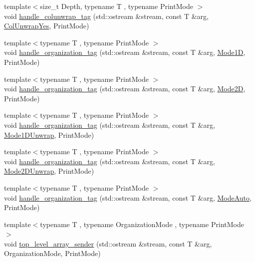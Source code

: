 \begin{DoxyCompactItemize}
{\footnotesize template$<$size\+\_\+t Depth, typename T , typename Print\+Mode $>$ }\\void \hyperlink{namespacegnuplotio_a3b8981d3f39de8a058b5f18484f06c3c}{handle\+\_\+colunwrap\+\_\+tag} (std\+::ostream \&stream, const T \&arg, \hyperlink{structgnuplotio_1_1_col_unwrap_yes}{Col\+Unwrap\+Yes}, Print\+Mode)
\item 
{\footnotesize template$<$typename T , typename Print\+Mode $>$ }\\void \hyperlink{namespacegnuplotio_af809657552a53c3b17f0400a5c210a7f}{handle\+\_\+organization\+\_\+tag} (std\+::ostream \&stream, const T \&arg, \hyperlink{structgnuplotio_1_1_mode1_d}{Mode1D}, Print\+Mode)
\item 
{\footnotesize template$<$typename T , typename Print\+Mode $>$ }\\void \hyperlink{namespacegnuplotio_a1310221abf0551a805d4482f0612317b}{handle\+\_\+organization\+\_\+tag} (std\+::ostream \&stream, const T \&arg, \hyperlink{structgnuplotio_1_1_mode2_d}{Mode2D}, Print\+Mode)
\item 
{\footnotesize template$<$typename T , typename Print\+Mode $>$ }\\void \hyperlink{namespacegnuplotio_a99e6125b97bc2ca4241f6275d83f05d4}{handle\+\_\+organization\+\_\+tag} (std\+::ostream \&stream, const T \&arg, \hyperlink{structgnuplotio_1_1_mode1_d_unwrap}{Mode1\+D\+Unwrap}, Print\+Mode)
\item 
{\footnotesize template$<$typename T , typename Print\+Mode $>$ }\\void \hyperlink{namespacegnuplotio_a9d2cee7a7f2ed9748a0f135b206836d3}{handle\+\_\+organization\+\_\+tag} (std\+::ostream \&stream, const T \&arg, \hyperlink{structgnuplotio_1_1_mode2_d_unwrap}{Mode2\+D\+Unwrap}, Print\+Mode)
\item 
{\footnotesize template$<$typename T , typename Print\+Mode $>$ }\\void \hyperlink{namespacegnuplotio_affc9cb6a9b6e5630523f0dbf8acdfcc2}{handle\+\_\+organization\+\_\+tag} (std\+::ostream \&stream, const T \&arg, \hyperlink{structgnuplotio_1_1_mode_auto}{Mode\+Auto}, Print\+Mode)
\item 
{\footnotesize template$<$typename T , typename Organization\+Mode , typename Print\+Mode $>$ }\\void \hyperlink{namespacegnuplotio_a1e452d861932700749421ce103ef8d48}{top\+\_\+level\+\_\+array\+\_\+sender} (std\+::ostream \&stream, const T \&arg, Organization\+Mode, Print\+Mode)
\end{DoxyCompactItemize}


